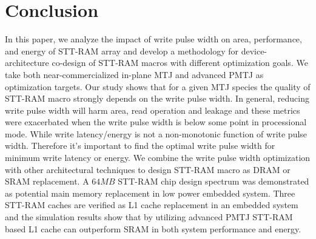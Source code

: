 \section{Conclusion} \label{sec:conclusion}

In this paper, we analyze the impact of write pulse width on area, performance, and energy of STT-RAM array and develop a methodology for device-architecture co-design of STT-RAM macros with different optimization goals. We take both near-commercialized in-plane MTJ and advanced PMTJ as optimization targets. Our study shows that for a given MTJ species the quality of STT-RAM macro strongly depends on the write pulse width. In general, reducing write pulse width will harm area, read operation and leakage and these metrics were exacerbated when the write pulse width is below some point in processional mode. While write latency/energy is not a non-monotonic function of write pulse width. Therefore it's important to find the optimal write pulse width for minimum write latency or energy. We combine the write pulse width optimization with other architectural techniques to design STT-RAM macro as DRAM or SRAM replacement. A $64MB$ STT-RAM chip design spectrum was demonstrated as potential main memory replacement in low power embedded system. Three STT-RAM caches are verified as L1 cache replacement in an embedded system and the simulation results show that by utilizing advanced PMTJ STT-RAM based L1 cache can outperform SRAM in both system performance and energy. 